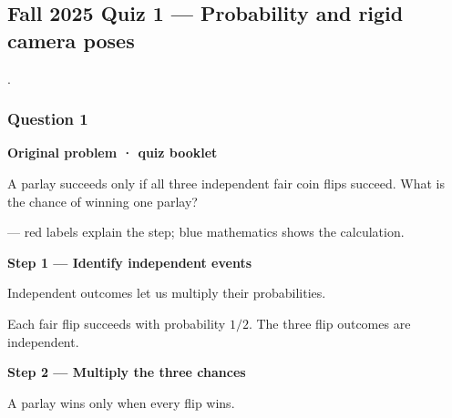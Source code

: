 \documentclass[letterpaper,11pt,english,openany,oneside]{jupyterBook}
\begin{document}
\subsection{Fall 2025 Quiz 1 — Probability and rigid camera poses}
\label{\detokenize{lectures/lecture01/quiz-workbook:fall-2025-quiz-1-probability-and-rigid-camera-poses}}\label{\detokenize{lectures/lecture01/quiz-workbook:quiz-source-17}}
\sphinxAtStartPar
{} .


\subsubsection{Question 1}
\label{\detokenize{lectures/lecture01/quiz-workbook:question-1}}\label{\detokenize{lectures/lecture01/quiz-workbook:quiz-17-q1}}\label{\detokenize{lectures/lecture01/quiz-workbook:ex-lec03-probability}}
\par\medskip\textbf{Original problem · quiz booklet}\par\smallskip

\sphinxAtStartPar
A parlay succeeds only if all three independent fair coin flips succeed. What is the chance of winning one parlay?

\par\medskip

\sphinxAtStartPar
{} — red labels explain the step; blue mathematics shows the calculation.

\par\medskip{}
{\color{QuizStepRed}\bfseries Step 1 — Identify independent events}\par\smallskip

\sphinxAtStartPar
{} Independent outcomes let us multiply their probabilities.

\sphinxAtStartPar
Each fair flip succeeds with probability {\color{QuizMathBlue} \(1/2\)}. The three flip outcomes are independent.

\par

\par\medskip{}
{\color{QuizStepRed}\bfseries Step 2 — Multiply the three chances}\par\smallskip

\sphinxAtStartPar
{} A parlay wins only when every flip wins.
\end{document}
